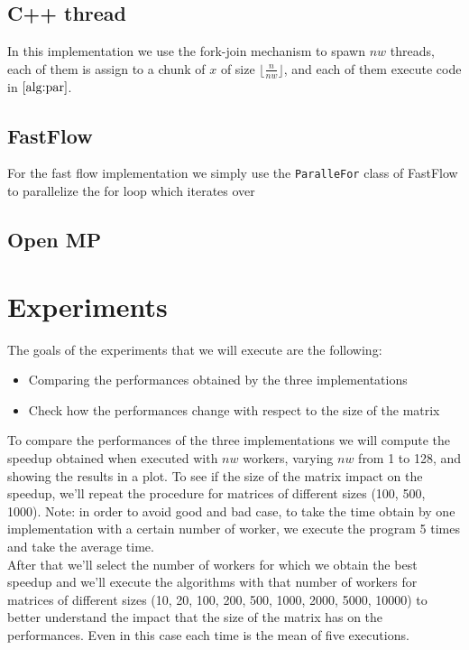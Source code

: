 \documentclass{article}
\begin{document}
	\subsection{C++ thread}
	In this implementation we use the fork-join mechanism to spawn $nw$ threads, each of them is assign to a chunk of $x$ of size $\lfloor\frac{n}{nw}\rfloor$, and each of them execute code in $\ref{alg:par}$.
	\subsection{FastFlow}
	For the fast flow implementation we simply use the \verb|ParalleFor| class of FastFlow to parallelize the for loop which iterates over 
	
	\subsection{Open MP}
	
	
	
	\section{Experiments}
	The goals of the experiments that we will execute are the following: 
	\begin{itemize}
		\item Comparing the performances obtained by the three implementations 
		\item Check how the performances change with respect to the size of the matrix
	\end{itemize}
	To compare the performances of the three implementations we will compute the speedup obtained when executed with $nw$ workers, varying $nw$ from 1 to 128, and showing the results in a plot. To see if the size of the matrix impact on the speedup, we'll repeat the procedure for matrices of different sizes (100, 500, 1000). Note: in order to avoid good and bad case, to take the time obtain by one implementation with a certain number of worker, we execute the program 5 times and take the average time. \\
	After that we'll select the number of workers for which we obtain the best speedup and we'll execute the algorithms with that number of workers for matrices of different sizes (10, 20, 100, 200, 500, 1000, 2000, 5000, 10000) to better understand the impact that the size of the matrix has on the performances. Even in this case each time is the mean of five executions.
	
	
\end{document}

